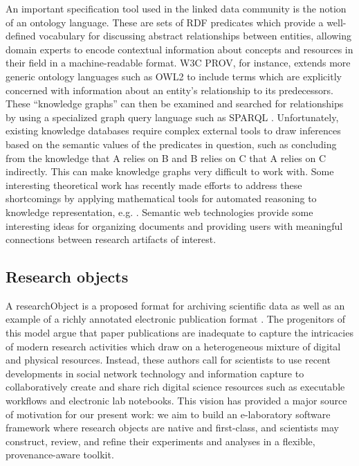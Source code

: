 \documentclass[../thesis]{subfiles}
\begin{document}
An important specification tool used in the linked data community is
the notion of an ontology language. These are sets of \gls{RDF}
predicates which provide a well-defined vocabulary for discussing
abstract relationships between entities, allowing domain experts to
encode contextual information about concepts and resources in their
field in a machine-readable format. W3C PROV, for instance, extends
more generic ontology languages such as OWL2 \cite{owl2-overview} to
include terms which are explicitly concerned with information about an
entity's relationship to its predecessors. These ``knowledge graphs''
can then be examined and searched for relationships by using a
specialized graph query language such as SPARQL \cite{SPARQL}.
Unfortunately, existing knowledge databases require complex external
tools to draw inferences based on the semantic values of the
predicates in question, such as concluding from the knowledge that A
relies on B and B relies on C that A relies on C indirectly. This can
make knowledge graphs very difficult to work with. Some interesting
theoretical work has recently made efforts to address these
shortcomings by applying mathematical tools for automated reasoning to
knowledge representation, e.g. \cite{spivak2012ologs}. Semantic web
technologies provide some interesting ideas for organizing documents
and providing users with meaningful connections between research
artifacts of interest.

\subsection{Research objects}
A \gls{researchObject} is a proposed format for archiving scientific
data as well as an example of a richly annotated electronic
publication format \cite{bechhofer2010research}. The progenitors of
this model argue that paper publications are inadequate to capture the
intricacies of modern research activities which draw on a
heterogeneous mixture of digital and physical resources. Instead,
these authors call for scientists to use recent developments in social
network technology and information capture to collaboratively create
and share rich digital science resources such as executable workflows
and electronic lab notebooks. This vision has provided a major source
of motivation for our present work: we aim to build an e-laboratory
software framework where research objects are native and first-class,
and scientists may construct, review, and refine their experiments and
analyses in a flexible, provenance-aware toolkit.
\end{document}
